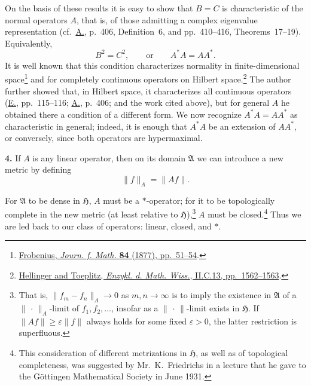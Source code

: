 \documentclass[fontsize=13pt,paper=b5,leqno,bookmarkpackage=false]{scrartcl}
\begin{document}
On the basis of these results it is easy to show that \(B=C\) is
characteristic of the normal operators \(A\), that is, of those
admitting a complex eigenvalue representation
(cf.\ \hyperlink{bib:A}{A.}, p.~406,
Definition~6, and pp.~410--416, Theorems~17--19). Equivalently,
\label{eq:intro-normality-condition}
\[
  B^2=C^2,
  \qquad\text{or}\qquad
  A^*A=AA^*.
\]
It is well known that this condition characterizes normality in
finite-dimensional space\footnote{\label{fn:12}%
\hypertarget{bib:Frobenius1877}{\href{https://doi.org/10.1515/crelle-1878-18788403}{%
Frobenius, \emph{Journ. f. Math.} \textbf{84} (1877), pp.~51--54}}.}
and for completely continuous operators on Hilbert
space.\footnote{\label{fn:13}%
\hypertarget{bib:HellingerToeplitz}{\href{https://doi.org/10.1007/978-3-663-15917-9}{%
Hellinger and Toeplitz, \emph{Enzykl. d. Math. Wiss.}, II.C.13,
pp.~1562--1563}}.}
The author further showed that, in Hilbert space, it characterizes all
continuous operators (\hyperlink{bib:E}{E.}, pp.~115--116;
\hyperlink{bib:A}{A.}, p.~406; and the work cited
above), but for general \(A\) he obtained there a condition of a
different form. We now recognize \(A^*A=AA^*\) as characteristic in
general; indeed, it is enough that \(A^*A\) be an extension of \(AA^*\),
or conversely, since both operators are hypermaximal.

\label{intro:4}
\noindent\textbf{4.}
If \(A\) is any linear operator, then on its domain \(\mathfrak A\) we
can introduce a new metric by defining
\[
  \lVert f\rVert_A=\lVert Af\rVert.
\]


For \(\mathfrak A\) to be dense in \(\mathfrak H\), \(A\) must be a
\(*\)-operator; for it to be topologically complete in the new metric
(at least relative to \(\mathfrak H\)),\footnote{\label{fn:14}%
That is, \(\lVert f_m-f_n\rVert_A\to0\) as \(m,n\to\infty\) is to imply
the existence in \(\mathfrak A\) of a
\(\lVert\,\cdot\,\rVert_A\)-limit of \(f_1,f_2,\ldots\), insofar as a
\(\lVert\,\cdot\,\rVert\)-limit exists in \(\mathfrak H\). If
\(\lVert Af\rVert\geq\varepsilon\lVert f\rVert\) always holds for some
fixed \(\varepsilon>0\), the latter restriction is superfluous.}
\(A\) must be closed.\footnote{\label{fn:15}%
This consideration of different metrizations in \(\mathfrak H\), as
well as of topological completeness, was suggested by Mr.~K.~Friedrichs
in a lecture that he gave to the Göttingen Mathematical Society in
June 1931.}
Thus we are led back to our class of operators: linear, closed, and
\(*\).
\end{document}
